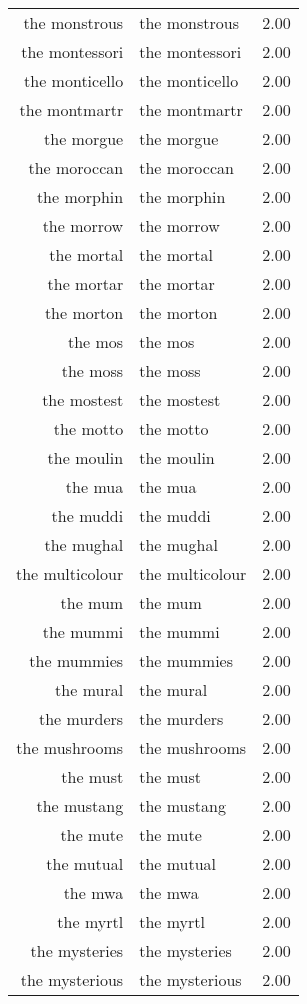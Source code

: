 \begin{table}[ht]
\begin{tabular}{rlr}
  the monstrous & the monstrous & 2.00 \\ 
  the montessori & the montessori & 2.00 \\ 
  the monticello & the monticello & 2.00 \\ 
  the montmartr & the montmartr & 2.00 \\ 
  the morgue & the morgue & 2.00 \\ 
  the moroccan & the moroccan & 2.00 \\ 
  the morphin & the morphin & 2.00 \\ 
  the morrow & the morrow & 2.00 \\ 
  the mortal & the mortal & 2.00 \\ 
  the mortar & the mortar & 2.00 \\ 
  the morton & the morton & 2.00 \\ 
  the mos & the mos & 2.00 \\ 
  the moss & the moss & 2.00 \\ 
  the mostest & the mostest & 2.00 \\ 
  the motto & the motto & 2.00 \\ 
  the moulin & the moulin & 2.00 \\ 
  the mua & the mua & 2.00 \\ 
  the muddi & the muddi & 2.00 \\ 
  the mughal & the mughal & 2.00 \\ 
  the multicolour & the multicolour & 2.00 \\ 
  the mum & the mum & 2.00 \\ 
  the mummi & the mummi & 2.00 \\ 
  the mummies & the mummies & 2.00 \\ 
  the mural & the mural & 2.00 \\ 
  the murders & the murders & 2.00 \\ 
  the mushrooms & the mushrooms & 2.00 \\ 
  the must & the must & 2.00 \\ 
  the mustang & the mustang & 2.00 \\ 
  the mute & the mute & 2.00 \\ 
  the mutual & the mutual & 2.00 \\ 
  the mwa & the mwa & 2.00 \\ 
  the myrtl & the myrtl & 2.00 \\ 
  the mysteries & the mysteries & 2.00 \\ 
  the mysterious & the mysterious & 2.00 \\ 

\end{tabular}
\end{table}
